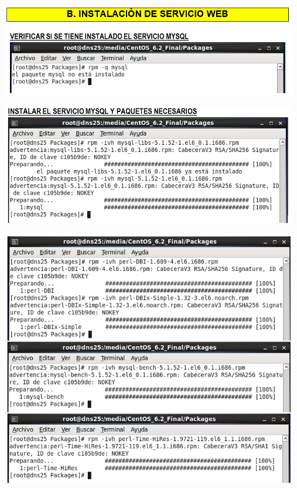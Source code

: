 \begin{itemize}
	\begin{center}
		\includegraphics[width=13cm]{./Imagenes/3a}
		\end{center}
\end{itemize} 

\begin{itemize}
	\begin{center}
		\includegraphics[width=13cm]{./Imagenes/4a}
		\end{center}
\end{itemize} 

\begin{itemize}
	\begin{center}
		\includegraphics[width=13cm]{./Imagenes/5a}
		\end{center}
\end{itemize} 

